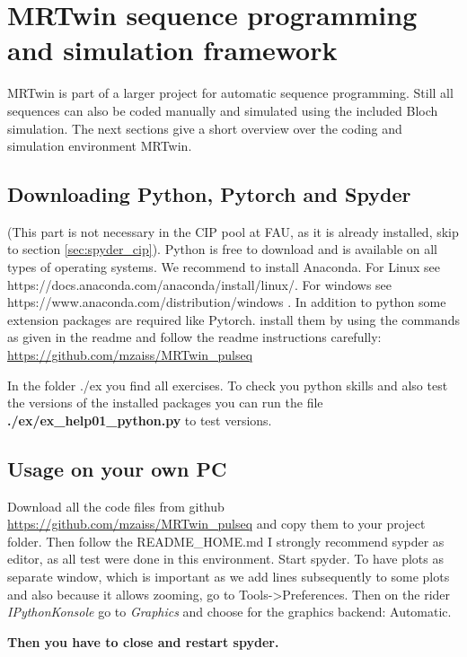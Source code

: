 \documentclass[a4paper,12pt]{extarticle}
\begin{document}
\newpage

\section{MRTwin sequence programming and simulation framework}
\vspace{7.5cm}
MRTwin is part of a larger project for automatic sequence programming. Still all sequences can also be coded manually and simulated using the included Bloch simulation. 
The next sections give a short overview over the coding and simulation environment MRTwin.

\subsection{Downloading Python, Pytorch and Spyder}
(This part is not necessary in the CIP pool at FAU, as it is already installed, skip to  section \ref{sec:spyder_cip}).
			Python is free to download and is available on all types of operating systems. We recommend to install Anaconda. For Linux see https://docs.anaconda.com/anaconda/install/linux/. For windows see https://www.anaconda.com/distribution/windows . 
			In addition to python some extension packages are required like Pytorch. install them by using the commands  as given in the readme and follow the readme instructions carefully:
			 \href{https://github.com/mzaiss/MRTwin_pulseq}{https://github.com/mzaiss/MRTwin\_pulseq}

In the folder ./ex you find all exercises. 
To check you python skills and also test the versions of the installed packages you can run the file \textbf{./ex/ex\_help01\_python.py} to test versions.

\subsection{Usage on your own PC}
Download all the code files from github \href{https://github.com/mzaiss/MRTwin_pulseq}{https://github.com/mzaiss/MRTwin\_pulseq}   and copy them to your project folder.
Then follow the README\_HOME.md
I strongly recommend sypder as editor, as all test were done in this environment.
Start spyder.
To have plots as separate window, which is important as we add lines subsequently to some plots and also because it allows zooming, go to Tools->Preferences. Then on the rider \emph{IPythonKonsole} go to \emph{Graphics} and choose for the graphics backend: Automatic. 

\textbf{Then you have to close and restart spyder.}
\end{document}

